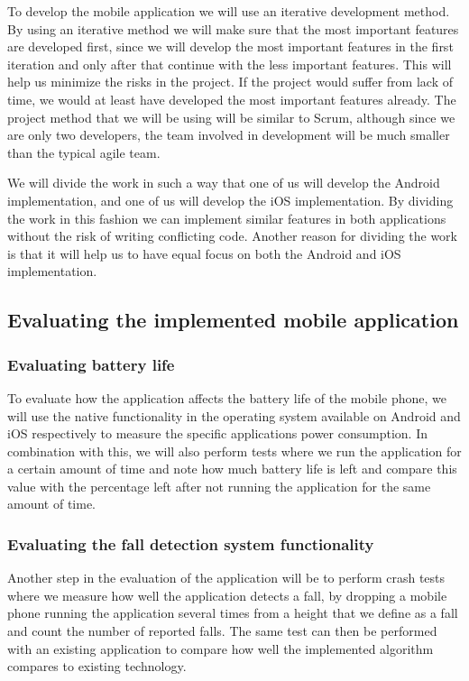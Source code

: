 \documentclass[11pt, a4paper, onecolumn]{article}
\begin{document}
To develop the mobile application we will use an iterative development method. By using an iterative method we will make sure that the most important features are developed first, since we will develop the most important features in the first iteration and only after that continue with the less important features. This will help us  minimize the risks in the project. If the project would suffer from lack of time, we would at least have developed the most important features already. The project method that we will be using will be similar to Scrum, although since we are only two developers, the team involved in development will be much smaller than the typical agile team.

We will divide the work in such a way that one of us will develop the Android implementation, and one of us will develop the iOS implementation. By dividing the work in this fashion we can implement similar features in both applications without the risk of writing conflicting code. Another reason for dividing the work is that it will help us to have equal focus on both the Android and iOS implementation.

\subsection{Evaluating the implemented mobile application}

\subsubsection{Evaluating battery life}

To evaluate how the application affects the battery life of the mobile phone, we will use the native functionality in the operating system available on Android and iOS respectively to measure the specific applications power consumption.
In combination with this, we will also perform tests where we run the application for a certain amount of time and note how much battery life is left and compare this value with the percentage left after not running the application for the same amount of time.

\subsubsection{Evaluating the fall detection system functionality}

Another step in the evaluation of the application will be to perform crash tests where we measure how well the application detects a fall, by dropping a mobile phone running the application several times from a height that we define as a fall and count the number of reported falls. The same test can then be performed with an existing application to compare how well the implemented algorithm compares to existing technology.
\end{document}

